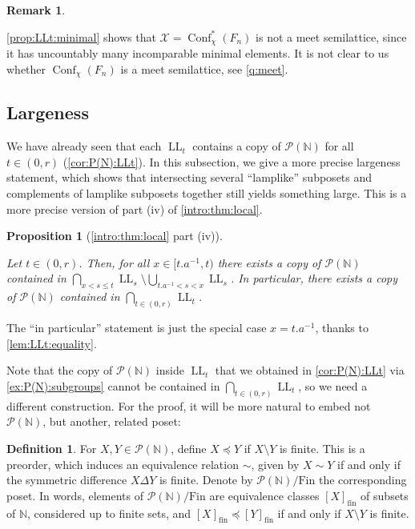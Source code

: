 \documentclass[reqno,12pt]{amsart}\setcounter{tocdepth}{1}
\newtheorem{proposition}[theorem]{Proposition}
\theoremstyle{definition}
\newtheorem{definition}[theorem]{Definition}
\newtheorem{remark}[theorem]{Remark}
\newcommand{\N}{\mathbb{N}}
\DeclareMathOperator{\Conf}{Conf}
\DeclareMathOperator{\LL}{LL}
\newcommand{\X}{\mathcal{X}}
\numberwithin{equation}{section}
\begin{document}
\begin{remark}
\label{rem:meet}

\cref{prop:LLt:minimal} shows that $\X = \Conf^\ast_{\chi}(F_n)$ is not a meet semilattice, since it has uncountably many incomparable minimal elements.
It is not clear to us whether $\Conf_\chi(F_n)$ is a meet semilattice, see \cref{q:meet}.
\end{remark}


\subsection{Largeness}

We have already seen that each $\LL_t$ contains a copy of $\mathcal{P}(\N)$ for all $t \in (0, r)$ (\cref{cor:P(N):LLt}). In this subsection, we give a more precise largeness statement, which shows that intersecting several ``lamplike'' subposets and complements of lamplike subposets together still yields something large. This is a more precise version of part (iv) of \cref{intro:thm:local}.

\begin{proposition}[\cref{intro:thm:local} part (iv)]
\label{prop:intersections}

Let $t \in (0, r)$. Then, for all $x \in [t.a^{-1}, t)$ there exists a copy of $\mathcal{P}(\N)$ contained in $\displaystyle \bigcap_{x < s \leq t} \LL_s \setminus \bigcup_{t.a^{-1} < s < x} \LL_s$. In particular, there exists a copy of $\mathcal{P}(\N)$ contained in $\displaystyle \bigcap_{t \in (0, r)} \LL_t$.
\end{proposition}

The ``in particular'' statement is just the special case $x=t.a^{-1}$, thanks to \cref{lem:LLt:equality}.

Note that the copy of $\mathcal{P}(\N)$ inside $\LL_t$ that we obtained in \cref{cor:P(N):LLt} via \cref{ex:P(N):subgroups} cannot be contained in $\displaystyle \bigcap_{t \in (0, r)} \LL_t$, so we need a different construction. For the proof, it will be more natural to embed not $\mathcal{P}(\N)$, but another, related poset:

\begin{definition}
For $X, Y \in \mathcal{P}(\N)$, define $X \preceq Y$ if $X \setminus Y$ is finite. This is a preorder, which induces an equivalence relation $\sim$, given by $X \sim Y$ if and only if the symmetric difference $X \Delta Y$ is finite. Denote by $\mathcal{P}(\N)/\mathrm{Fin}$ the corresponding poset. In words, elements of $\mathcal{P}(\N)/\mathrm{Fin}$ are equivalence classes $[X]_{\mathrm{fin}}$ of subsets of $\N$, considered up to finite sets, and $[X]_{\mathrm{fin}} \preccurlyeq [Y]_{\mathrm{fin}}$ if and only if $X \setminus Y$ is finite.
\end{definition}
\end{document}
